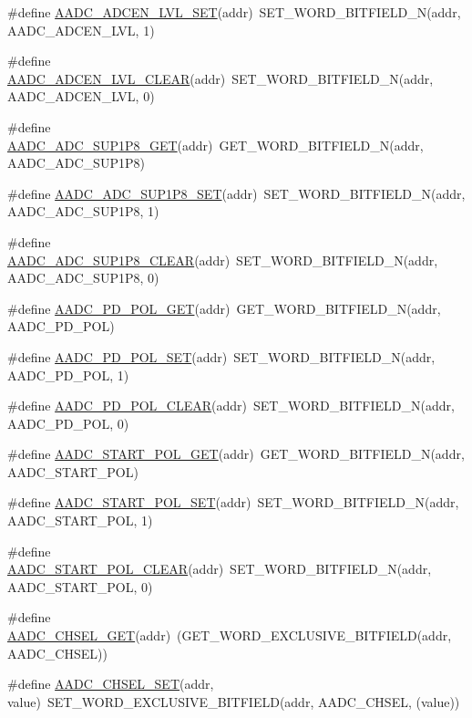 \begin{DoxyCompactItemize}
\item 
\#define \hyperlink{a00542_ae42950e3572279efbff281e6259ac59f}{AADC\_\-ADCEN\_\-LVL\_\-SET}(addr)~SET\_\-WORD\_\-BITFIELD\_\-N(addr, AADC\_\-ADCEN\_\-LVL, 1)
\item 
\#define \hyperlink{a00542_a3d8b448312368efc0cd57e1f91d17a3f}{AADC\_\-ADCEN\_\-LVL\_\-CLEAR}(addr)~SET\_\-WORD\_\-BITFIELD\_\-N(addr, AADC\_\-ADCEN\_\-LVL, 0)
\item 
\#define \hyperlink{a00542_acf7b13e8bc2b513e664fd612ee55c71e}{AADC\_\-ADC\_\-SUP1P8\_\-GET}(addr)~GET\_\-WORD\_\-BITFIELD\_\-N(addr, AADC\_\-ADC\_\-SUP1P8)
\item 
\#define \hyperlink{a00542_adcdfd227830e860bc1668489c176fa0a}{AADC\_\-ADC\_\-SUP1P8\_\-SET}(addr)~SET\_\-WORD\_\-BITFIELD\_\-N(addr, AADC\_\-ADC\_\-SUP1P8, 1)
\item 
\#define \hyperlink{a00542_a06ccbdc206cd5ee3278c36d065b3c1e1}{AADC\_\-ADC\_\-SUP1P8\_\-CLEAR}(addr)~SET\_\-WORD\_\-BITFIELD\_\-N(addr, AADC\_\-ADC\_\-SUP1P8, 0)
\item 
\#define \hyperlink{a00542_a3595377b4693f910377619b2e22cee4d}{AADC\_\-PD\_\-POL\_\-GET}(addr)~GET\_\-WORD\_\-BITFIELD\_\-N(addr, AADC\_\-PD\_\-POL)
\item 
\#define \hyperlink{a00542_a6586af7a507ea8adefb523c85c02c3c0}{AADC\_\-PD\_\-POL\_\-SET}(addr)~SET\_\-WORD\_\-BITFIELD\_\-N(addr, AADC\_\-PD\_\-POL, 1)
\item 
\#define \hyperlink{a00542_ac2e72a7f853d4e10c5e781160ab87784}{AADC\_\-PD\_\-POL\_\-CLEAR}(addr)~SET\_\-WORD\_\-BITFIELD\_\-N(addr, AADC\_\-PD\_\-POL, 0)
\item 
\#define \hyperlink{a00542_a13f31408570a3316bcb57018c3fb9d56}{AADC\_\-START\_\-POL\_\-GET}(addr)~GET\_\-WORD\_\-BITFIELD\_\-N(addr, AADC\_\-START\_\-POL)
\item 
\#define \hyperlink{a00542_a1e59276ebf8f7b7ed7ea5ad8f25dc60d}{AADC\_\-START\_\-POL\_\-SET}(addr)~SET\_\-WORD\_\-BITFIELD\_\-N(addr, AADC\_\-START\_\-POL, 1)
\item 
\#define \hyperlink{a00542_a14670c2fb2107c8bf072c7575d0b63e6}{AADC\_\-START\_\-POL\_\-CLEAR}(addr)~SET\_\-WORD\_\-BITFIELD\_\-N(addr, AADC\_\-START\_\-POL, 0)
\item 
\#define \hyperlink{a00542_a7939c18d85d81fa5229e17288e2cfb44}{AADC\_\-CHSEL\_\-GET}(addr)~(GET\_\-WORD\_\-EXCLUSIVE\_\-BITFIELD(addr, AADC\_\-CHSEL))
\item 
\#define \hyperlink{a00542_ac9be45da117c888e63c598f6ba14471d}{AADC\_\-CHSEL\_\-SET}(addr, value)~SET\_\-WORD\_\-EXCLUSIVE\_\-BITFIELD(addr, AADC\_\-CHSEL, (value))

\end{DoxyCompactItemize}
